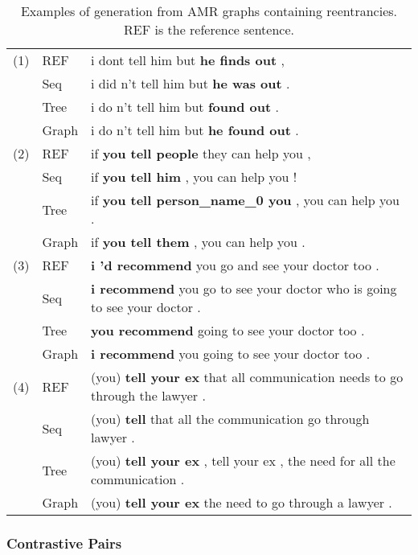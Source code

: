 \documentclass[11pt,a4paper]{article}
\begin{document}
\begin{table*}
\centering
\begin{tabular}{lll}
\toprule
(1)
& {\sc REF} & i dont tell him but \textbf{he finds out} ,\\
& {\sc Seq} & i did n't tell him but \textbf{he was out} .\\
& {\sc Tree} & i do n't tell him but \textbf{found out} .\\
& {\sc Graph} & i do n't tell him but \textbf{he found out} .\\
\midrule
(2)
& {\sc REF} & if \textbf{you tell people} they can help you ,\\
& {\sc Seq} & if \textbf{you tell him} , you can help you !\\
& {\sc Tree} & if \textbf{you tell person\_name\_0 you} , you can help you .\\
& {\sc Graph} & if \textbf{you tell them} , you can help you .\\
\midrule
(3)
& {\sc REF} & \textbf{i 'd recommend} you go and see your doctor too .\\
& {\sc Seq} & \textbf{i recommend} you go to see your doctor who is going to see your doctor .\\
& {\sc Tree} & \textbf{you recommend} going to see your doctor too .\\
& {\sc Graph} & \textbf{i recommend} you going to see your doctor too .\\
\midrule
(4) 
& {\sc REF} & (you) \textbf{tell your ex} that all communication needs to go through the lawyer .\\
& {\sc Seq} & (you) \textbf{tell} that all the communication go through lawyer .\\
& {\sc Tree} & (you) \textbf{tell your ex} , tell your ex , the need for all the communication .\\
& {\sc Graph} & (you) \textbf{tell your ex} the need to go through a lawyer .\\
\bottomrule
\end{tabular}
\caption{Examples of generation from AMR graphs containing reentrancies. {\sc REF} is the reference sentence.}
\label{tab:example_reentrancies}
\end{table*}

\subsubsection{Contrastive Pairs}
\end{document}
